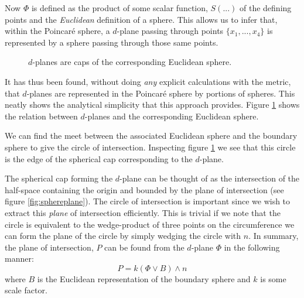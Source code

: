 Now $\Phi$ is defined as the product of some scalar function, $S(...)$
of the defining points and the \emph{Euclidean} definition of a sphere. This
allows us to infer that, within the Poincar\'e sphere, a $d$-plane passing
through points $\{x_1, ..., x_4\}$ is represented by a sphere passing
through those same points.

\begin{figure} \centering
{}
\caption{$d$-planes are caps of the corresponding Euclidean sphere.}
\label{fig:dplane}
\end{figure}

It has thus been found, without doing \emph{any} explicit calculations with
the metric, that
$d$-planes are represented in the Poincar\'e sphere by portions of spheres.
This neatly shows the analytical simplicity that this approach provides.
Figure \ref{fig:dplane} shows the
relation between $d$-planes and the corresponding Euclidean sphere.


We can find the meet between the associated Euclidean sphere and the
boundary sphere to give the circle of intersection. Inspecting figure
\ref{fig:dplane} we
see that this circle is the edge of the spherical
cap corresponding to the $d$-plane.

The spherical cap forming the $d$-plane can be thought of as the
intersection of the half-space containing the origin and bounded
by the plane of intersection (see figure \ref{fig:sphereplane}).
The circle of intersection is important since we wish to extract
this \emph{plane} of intersection efficiently. This is trivial
if we note that the circle is equivalent to the wedge-product of three
points on the circumference we can form the plane of the circle
by simply wedging the circle with $n$. In summary,
the plane of intersection, $P$ can be found from the $d$-plane $\Phi$ in
the following manner:
\[
P = k (\Phi \vee B) \wedge n
\]
where $B$ is the Euclidean representation of the boundary sphere
and $k$ is some scale factor.


